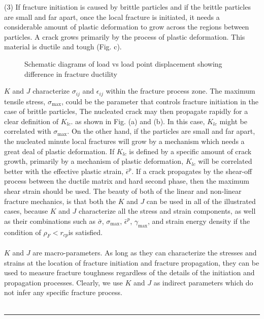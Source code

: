 \documentclass[12pt]{article}
\begin{document}
(3) If fracture initiation is caused by brittle particles and if the brittle particles are small and far
apart, once the local fracture is initiated, it needs a considerable amount of plastic deformation to grow
across the regions between particles. A crack grows primarily by the process of plastic deformation.
This material is ductile and tough (Fig. c).
\begin{figure}[H]
    \centering
    \captionsetup{labelformat=empty}
    \caption{Schematic diagrams of load vs load point displacement showing difference in fracture ductility}
\end{figure}
$K$ and $J$ characterize $\sigma_{ij}$ and $\epsilon_{ij}$ within the fracture process zone. The maximum tensile stress, $\sigma_{\text{max}}$,
could be the parameter that controls fracture initiation in the case of brittle particles, The nucleated
crack may then propagate rapidly for a clear definition of $K_{lc}$. as shown in Fig. (a) and (b). In this
case, $K_{lc}$ might be correlated with $\sigma_{\text{max}}$. On the other hand, if the particles are small and far apart, the
nucleated minute local fractures will grow by a mechanism which needs a great deal of plastic
deformation. If $K_{lc}$ is defined by a specific amount of crack growth, primarily by a mechanism of plastic
deformation, $K_{lc}$ will be correlated better with the effective plastic strain, $\bar{\epsilon} ^ p$. If a crack propagates by
the shear-off process between the ductile matrix and hard second phase, then the maximum shear strain
should be used. The beauty of both of the linear and non-linear fracture mechanics, is that both the $K$
and $J$ can be used in all of the illustrated cases, because $K$ and $J$ characterize all the stress and strain
components, as well as their combinations such as $\bar{\sigma}$, $\sigma_{\text{max}}$, $\bar{\epsilon} ^ p$, $\gamma_{\text{max}}$, and strain energy density if the
condition of $\rho_F < r_{cp}$is satisfied.
\\\\
$K$ and $J$ are macro-parameters. As long as they can characterize the stresses and strains at the
location of fracture initiation and fracture propagation, they can be used to measure fracture toughness
regardless of the details of the initiation and propagation processes. Clearly, we use $K$ and $J$ as indirect
parameters which do not infer any specific fracture process.
\\\\\rule{\textwidth}{.1em}
\end{document}
